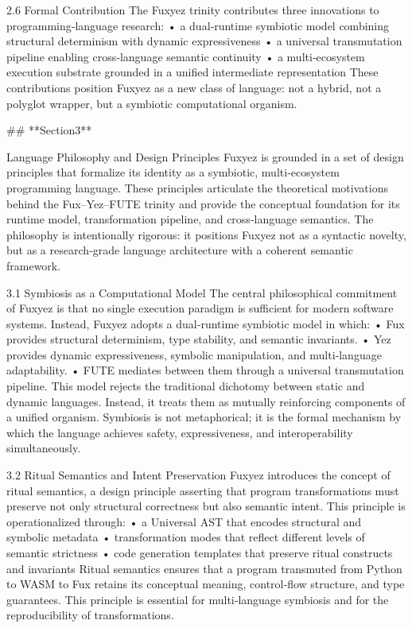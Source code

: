 2.6 Formal Contribution
The Fuxyez trinity contributes three innovations to programming‑language research:
• 	a dual‑runtime symbiotic model combining structural determinism with dynamic expressiveness
• 	a universal transmutation pipeline enabling cross‑language semantic continuity
• 	a multi‑ecosystem execution substrate grounded in a unified intermediate representation
These contributions position Fuxyez as a new class of language: not a hybrid, not a polyglot wrapper, but a symbiotic computational organism.

## **Section3**

Language Philosophy and Design Principles
Fuxyez is grounded in a set of design principles that formalize its identity as a symbiotic, multi‑ecosystem programming language. These principles articulate the theoretical motivations behind the Fux–Yez–FUTE trinity and provide the conceptual foundation for its runtime model, transformation pipeline, and cross‑language semantics. The philosophy is intentionally rigorous: it positions Fuxyez not as a syntactic novelty, but as a research‑grade language architecture with a coherent semantic framework.

3.1 Symbiosis as a Computational Model
The central philosophical commitment of Fuxyez is that no single execution paradigm is sufficient for modern software systems. Instead, Fuxyez adopts a dual‑runtime symbiotic model in which:
• 	Fux provides structural determinism, type stability, and semantic invariants.
• 	Yez provides dynamic expressiveness, symbolic manipulation, and multi‑language adaptability.
• 	FUTE mediates between them through a universal transmutation pipeline.
This model rejects the traditional dichotomy between static and dynamic languages. Instead, it treats them as mutually reinforcing components of a unified organism. Symbiosis is not metaphorical; it is the formal mechanism by which the language achieves safety, expressiveness, and interoperability simultaneously.

3.2 Ritual Semantics and Intent Preservation
Fuxyez introduces the concept of ritual semantics, a design principle asserting that program transformations must preserve not only structural correctness but also semantic intent. This principle is operationalized through:
• 	a Universal AST that encodes structural and symbolic metadata
• 	transformation modes that reflect different levels of semantic strictness
• 	code generation templates that preserve ritual constructs and invariants
Ritual semantics ensures that a program transmuted from Python to WASM to Fux retains its conceptual meaning, control‑flow structure, and type guarantees. This principle is essential for multi‑language symbiosis and for the reproducibility of transformations.

